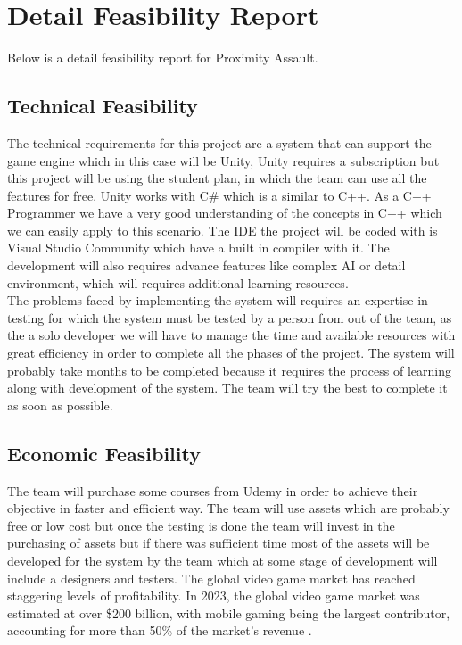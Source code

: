 \section{Detail Feasibility Report}
Below is a detail feasibility report for Proximity Assault.
\subsection{Technical Feasibility}
The technical requirements for this project are a system that can support the game engine which in this case will be Unity, Unity requires a subscription but this project will be using the student plan, in which the team can use all the features for free. Unity works with C\# which is a similar to C++. As a C++ Programmer we have a very good understanding of the concepts in C++ which we can easily apply to this scenario. The IDE the project will be coded with is Visual Studio Community which have a built in compiler with it.
The development will also requires advance features like complex AI or detail environment, which will requires additional learning resources.\\
The problems faced by implementing the system will requires an expertise in testing for which the system must be tested by a person from out of the team, as the a solo developer we will have to manage the time and available resources with great efficiency in order to complete all the phases of the project.
The system will probably take months to be completed because it requires the process of learning along with development of the system. The team will try the best to complete it as soon as possible.

\subsection{Economic Feasibility}
The team will purchase some courses from Udemy in order to achieve their objective in faster and efficient way.
The team will use assets which are probably free or low cost but once the testing is done the team will invest in the purchasing of assets but if there was sufficient time most of the assets will be developed for the system by the team which at some stage of development will include a designers and testers.
The global video game market has reached staggering levels of profitability. In 2023, the global video game market was estimated at over \$200 billion, with mobile gaming being the largest contributor, accounting for more than 50\% of the market's revenue \cite{newzoo2023}.

